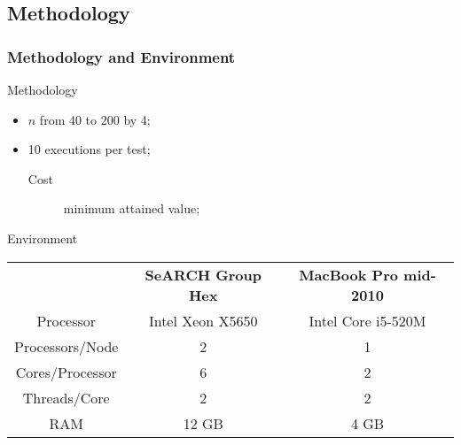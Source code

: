 \subsection{Methodology}
\label{sec:methodology}

\begin{frame}
	\frametitle{Methodology and Environment}
	\vfill
	\begin{block}{Methodology}
		\begin{itemize}
			\item{$n$ from 40 to 200 by 4;}
			\vfill
			\item{10 executions per test;
			\begin{description}
				\item[Cost]{minimum attained value;}
			\end{description}
			}
		\end{itemize}
	\end{block}
	\vfill
	\begin{block}{Environment}
		\begin{table}
			\begin{tabular}{c||cc}
			& \textbf{SeARCH Group Hex} & \textbf{MacBook Pro mid-2010}	\\
			Processor & Intel\textsuperscript{\textregistered} Xeon\textsuperscript{\textregistered} X5650 & Intel\textsuperscript{\textregistered} Core\textsuperscript{\texttrademark} i5-520M	\\
			Processors/Node & 2 & 1	\\
			Cores/Processor & 6 & 2	\\
			Threads/Core & 2 & 2	\\
			RAM	& 12 GB & 4 GB	\\
			\end{tabular}
		\end{table}
	\end{block}
	\vfill
\end{frame}